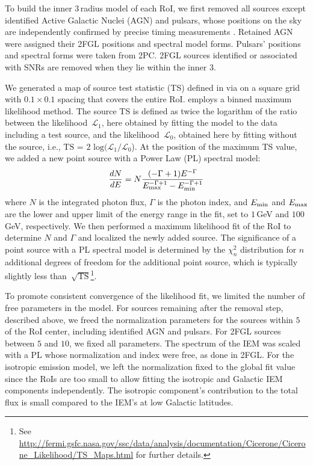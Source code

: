 {To build the inner $3$\degr{}\,radius model of each RoI, we first removed all sources except identified Active Galactic Nuclei (AGN) and pulsars, whose positions on the sky are independently confirmed by precise timing measurements \citep{2PC}. Retained AGN were assigned their 2FGL positions and spectral model forms. Pulsars' positions and spectral forms were taken from 2PC. 2FGL sources identified or associated with SNRs are removed when they lie within the inner $3$\degr{}. %

We generated a map of source test statistic (TS) defined in \citet{Mattox96} via \ptlike{} on a square grid with $0.1$\degr{}\,$\times$\,$0.1$\degr{} spacing that covers the entire RoI. \ptlike{} employs a binned maximum likelihood method. The source TS is defined as twice the logarithm of the ratio between the likelihood~$\mathcal{L}_1$, here obtained by fitting the model to the data including a test source, and the likelihood~$\mathcal{L}_0$, obtained here by fitting without the source, i.e., $\textrm{TS = 2 log}(\mathcal{L}_1/\mathcal{L}_0$). At the position of the maximum TS value, we added a new point source with a Power Law (PL) spectral model:
\begin{equation}
	\label{eqn:PL}
	\frac{dN}{dE} = N\frac{(-\Gamma+1)E^{-\Gamma}} {E_{\rm max}^{-\Gamma+1} - E_{\rm min}^{-\Gamma+1}}
\end{equation}
where $N$ is the integrated photon flux, $\Gamma$ is the photon index, and $E_{\rm min}$ and $E_{\rm max}$ are the lower and upper limit of the energy range in the fit, set to $1$\,GeV and $100$\,GeV, respectively.
We then performed a maximum likelihood fit of the RoI to determine $N$ and $\Gamma$ and localized the newly added source. 
The significance of a point source with a PL spectral model is determined by the $\chi^2_n$ distribution for $n$ additional degrees of freedom for the additional point source, which is typically slightly less than~$\sqrt{\textrm{TS}}$\footnote{See \url{http://fermi.gsfc.nasa.gov/ssc/data/analysis/documentation/Cicerone/Cicerone_Likelihood/TS_Maps.html} for further details.}.

To promote consistent convergence of the likelihood fit, we limited the number of free parameters in the model. For sources remaining after the removal step, described above, we freed the normalization parameters for the sources within $5$\degr{} of the RoI center, including identified AGN and pulsars. For 2FGL sources between $5$\degr{} and $10$\degr{}, we fixed all parameters. The spectrum of the IEM was scaled with a PL whose normalization and index were free, as done in 2FGL.
For the isotropic emission model, we left the normalization fixed to the global fit value since the RoIs are too small to allow fitting %
the isotropic and Galactic IEM components independently. The isotropic component's contribution to the total flux is small compared to the IEM's at low Galactic latitudes.

}
